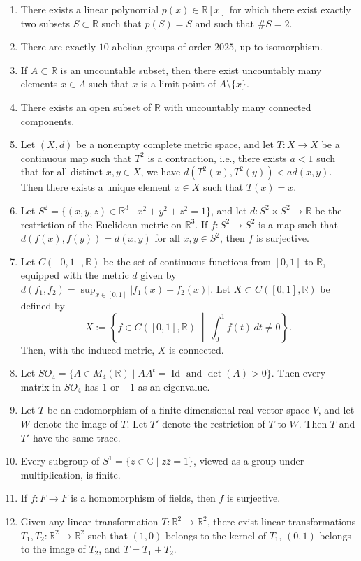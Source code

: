\documentclass[11pt, a4paper]{article}
\begin{document}
\begin{enumerate}
  \item There exists a linear polynomial $p(x) \in \mathbb{R}[x]$ for which there exist exactly two subsets $S \subset \mathbb{R}$ such that $p(S) = S$ and such that $\#S = 2$.
  \item There are exactly $10$ abelian groups of order $2025$, up to isomorphism.
  \item If $A \subset \mathbb{R}$ is an uncountable subset, then there exist uncountably many elements $x \in A$ such that $x$ is a limit point of $A \setminus \{x\}$.
  \item There exists an open subset of $\mathbb{R}$ with uncountably many connected components.
  \item Let $(X, d)$ be a nonempty complete metric space, and let $T: X \to X$ be a continuous map such that $T^2$ is a contraction, i.e., there exists $a < 1$ such that for all distinct $x, y \in X$, we have $d(T^2(x), T^2(y)) < a d(x, y)$. Then there exists a unique element $x \in X$ such that $T(x) = x$.
  \item Let $S^2 = \{(x, y, z) \in \mathbb{R}^3 \mid x^2 + y^2 + z^2 = 1\}$, and let $d: S^2 \times S^2 \to \mathbb{R}$ be the restriction of the Euclidean metric on $\mathbb{R}^3$. If $f: S^2 \to S^2$ is a map such that $d(f(x), f(y)) = d(x, y)$ for all $x, y \in S^2$, then $f$ is surjective.
  \item Let $C([0,1], \mathbb{R})$ be the set of continuous functions from $[0,1]$ to $\mathbb{R}$, equipped with the metric $d$ given by $d(f_1, f_2) = \sup_{x \in [0,1]} |f_1(x) - f_2(x)|$. Let $X \subset C([0,1], \mathbb{R})$ be defined by
  \[
    X := \left\{f \in C([0,1], \mathbb{R}) \;\middle|\; \int_0^1 f(t)\,dt \ne 0\right\}.
  \]
  Then, with the induced metric, $X$ is connected.
  \item Let $SO_4 = \{A \in M_4(\mathbb{R}) \mid AA^t = \operatorname{Id} \text{ and } \det(A) > 0\}$. Then every matrix in $SO_4$ has $1$ or $-1$ as an eigenvalue.
  \item Let $T$ be an endomorphism of a finite dimensional real vector space $V$, and let $W$ denote the image of $T$. Let $T'$ denote the restriction of $T$ to $W$. Then $T$ and $T'$ have the same trace.
  \item Every subgroup of $S^1 = \{z \in \mathbb{C} \mid z \overline{z} = 1\}$, viewed as a group under multiplication, is finite.
  \item If $f: F \to F$ is a homomorphism of fields, then $f$ is surjective.
  \item Given any linear transformation $T: \mathbb{R}^2 \to \mathbb{R}^2$, there exist linear transformations $T_1, T_2: \mathbb{R}^2 \to \mathbb{R}^2$ such that $(1, 0)$ belongs to the kernel of $T_1$, $(0, 1)$ belongs to the image of $T_2$, and $T = T_1 + T_2$.

\end{enumerate}
\end{document}
